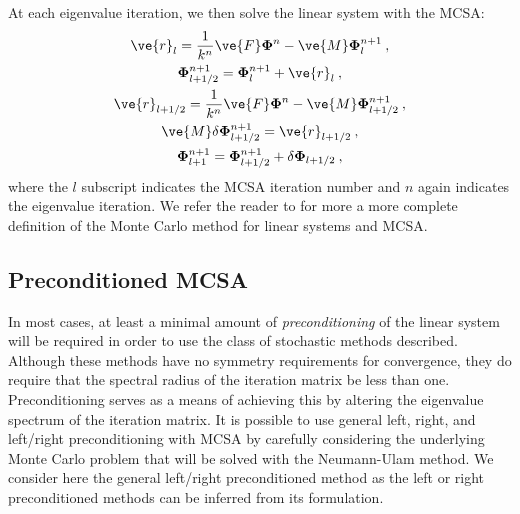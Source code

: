\documentclass[letterpaper,11pt]{article}
\begin{document}
At each eigenvalue iteration, we then solve the linear system with the
MCSA:
\begin{subequations}
  \begin{gather}
    \ve{r}_{l} = \frac{1}{k^n}\ve{F}\mathbf{\Phi}^n -
    \ve{M}\mathbf{\Phi}^{n+1}_{l}\:,\\
    \mathbf{\Phi}^{n+1}_{l+1/2} = \mathbf{\Phi}^{n+1}_l + \ve{r}_l\:,\\
    \ve{r}_{l+1/2} = \frac{1}{k^n}\ve{F}\mathbf{\Phi}^n -
    \ve{M}\mathbf{\Phi}^{n+1}_{l+1/2}\:,\\
    \ve{M}\delta\mathbf{\Phi}^{n+1}_{l+1/2} = \ve{r}_{l+1/2}\:,\\
    \mathbf{\Phi}^{n+1}_{l+1} = \mathbf{\Phi}^{n+1}_{l+1/2} + \delta
    \mathbf{\Phi}_{l+1/2}\:,
  \end{gather}
  \label{eq:mcsa}
\end{subequations}
where the $l$ subscript indicates the MCSA iteration number and $n$
again indicates the eigenvalue iteration. We refer the reader to
\cite{evans_monte_2014} for more a more complete definition of the
Monte Carlo method for linear systems and MCSA.

\subsection{Preconditioned MCSA}
\label{subsec:preconditioning}
In most cases, at least a minimal amount of \textit{preconditioning}
of the linear system will be required in order to use the class of
stochastic methods described. Although these methods have no symmetry
requirements for convergence, they do require that the spectral radius
of the iteration matrix be less than one. Preconditioning serves as a
means of achieving this by altering the eigenvalue spectrum of the
iteration matrix. It is possible to use general left, right, and left/right
preconditioning with MCSA by carefully considering the underlying
Monte Carlo problem that will be solved with the Neumann-Ulam
method. We consider here the general left/right preconditioned method
as the left or right preconditioned methods can be inferred from its
formulation. 
\end{document}
